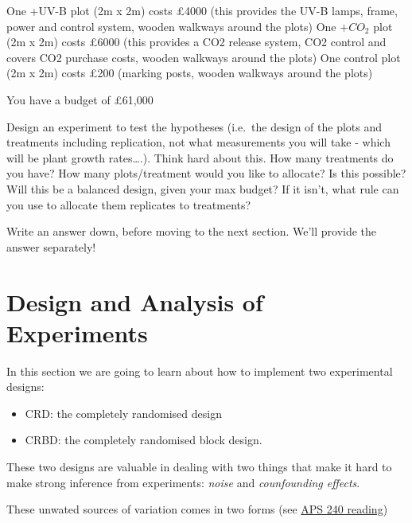 \documentclass[
]{book}
\providecommand{\tightlist}{%
  \setlength{\itemsep}{0pt}\setlength{\parskip}{0pt}}
\begin{document}
One +UV-B plot (2m x 2m) costs £4000 (this provides the UV-B lamps, frame, power and control system, wooden walkways around the plots)
One \(+CO_{2}\) plot (2m x 2m) costs £6000 (this provides a CO2 release system, CO2 control and covers CO2 purchase costs, wooden walkways around the plots)
One control plot (2m x 2m) costs £200 (marking posts, wooden walkways around the plots)

You have a budget of £61,000

Design an experiment to test the hypotheses (i.e.~the design of the plots and treatments including replication, not what measurements you will take - which will be plant growth rates\ldots.). Think hard about this. How many treatments do you have? How many plots/treatment would you like to allocate? Is this possible? Will this be a balanced design, given your max budget? If it isn't, what rule can you use to allocate them replicates to treatments?

Write an answer down, before moving to the next section. We'll provide the answer separately!

\hypertarget{design-and-analysis-of-experiments}{%
\chapter{Design and Analysis of Experiments}\label{design-and-analysis-of-experiments}}

In this section we are going to learn about how to implement two experimental designs:

\begin{itemize}
\tightlist
\item
  CRD: the completely randomised design
\item
  CRBD: the completely randomised block design.
\end{itemize}

These two designs are valuable in dealing with two things that make it hard to make strong inference from experiments: \emph{noise} and \emph{counfounding effects}.

These unwated sources of variation comes in two forms (see \href{https://dzchilds.github.io/stats-for-bio/principles-experimental-design.html\#confounded-and-noisy-experiments}{APS 240 reading})
\end{document}
